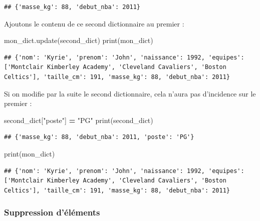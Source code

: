 \documentclass[12pt,]{book}
\newenvironment{Shaded}{\begin{snugshade}}{\end{snugshade}}
\newcommand{\StringTok}[1]{\textcolor[rgb]{0.31,0.60,0.02}{#1}}
\newcommand{\OperatorTok}[1]{\textcolor[rgb]{0.81,0.36,0.00}{\textbf{#1}}}
\newcommand{\BuiltInTok}[1]{#1}
\newcommand{\NormalTok}[1]{#1}
\numberwithin{equation}{section}
\numberwithin{countremarque}{section}
\begin{document}
\begin{lstlisting}
## {'masse_kg': 88, 'debut_nba': 2011}
\end{lstlisting}

Ajoutons le contenu de ce second dictionnaire au premier :

\begin{Shaded}
\begin{Highlighting}[]
\NormalTok{mon_dict.update(second_dict)}
\BuiltInTok{print}\NormalTok{(mon_dict)}
\end{Highlighting}
\end{Shaded}

\begin{lstlisting}
## {'nom': 'Kyrie', 'prenom': 'John', 'naissance': 1992, 'equipes': ['Montclair Kimberley Academy', 'Cleveland Cavaliers', 'Boston Celtics'], 'taille_cm': 191, 'masse_kg': 88, 'debut_nba': 2011}
\end{lstlisting}

Si on modifie par la suite le second dictionnaire, cela n'aura pas
d'incidence sur le premier :

\begin{Shaded}
\begin{Highlighting}[]
\NormalTok{second_dict[}\StringTok{"poste"}\NormalTok{] }\OperatorTok{=} \StringTok{"PG"}
\BuiltInTok{print}\NormalTok{(second_dict)}
\end{Highlighting}
\end{Shaded}

\begin{lstlisting}
## {'masse_kg': 88, 'debut_nba': 2011, 'poste': 'PG'}
\end{lstlisting}

\begin{Shaded}
\begin{Highlighting}[]
\BuiltInTok{print}\NormalTok{(mon_dict)}
\end{Highlighting}
\end{Shaded}

\begin{lstlisting}
## {'nom': 'Kyrie', 'prenom': 'John', 'naissance': 1992, 'equipes': ['Montclair Kimberley Academy', 'Cleveland Cavaliers', 'Boston Celtics'], 'taille_cm': 191, 'masse_kg': 88, 'debut_nba': 2011}
\end{lstlisting}

\subsubsection{Suppression d'éléments}\label{suppression-delements-1}
\end{document}

